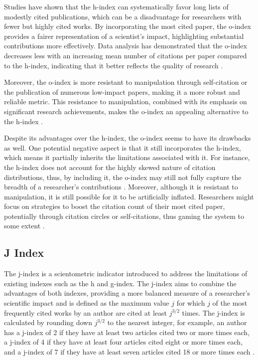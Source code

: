 Studies have shown that the h-index can systematically favor long lists of
modestly cited publications, which can be a disadvantage for researchers with
fewer but highly cited works. By incorporating the most cited paper, the
o-index provides a fairer representation of a scientist's impact, highlighting
substantial contributions more effectively. Data analysis has demonstrated that
the o-index decreases less with an increasing mean number of citations per
paper compared to the h-index, indicating that it better reflects the quality
of research \cite{dorogovtsev2015ranking}.

Moreover, the o-index is more resistant to manipulation through self-citation
or the publication of numerous low-impact papers, making it a more robust and
reliable metric. This resistance to manipulation, combined with its emphasis on
significant research achievements, makes the o-index an appealing alternative
to the h-index \cite{dorogovtsev2015ranking}.

Despite its advantages over the h-index, the o-index seems to have its
drawbacks as well. One potential negative aspect is that it still incorporates
the h-index, which means it partially inherits the limitations associated with
it. For instance, the h-index does not account for the highly skewed nature of
citation distributions, thus, by including it, the o-index may still not fully
capture the breadth of a researcher's contributions
\cite{dorogovtsev2015ranking}. Moreover, although it is resistant to
manipulation, it is still possible for it to be artificially inflated.
Researchers might focus on strategies to boost the citation count of their most
cited paper, potentially through citation circles or self-citations, thus
gaming the system to some extent \cite{dorogovtsev2015ranking}.

\subsection{J Index}
The j-index is a scientometric indicator introduced to address the limitations
of existing indexes such as the h and g-index. The j-index aims to combine the
advantages of both indexes, providing a more balanced measure of a researcher's
scientific impact and is defined as the maximum value $j$ for which $j$ of the
most frequently cited works by an author are cited at least $j^{3/2}$ times.
The j-index is calculated by rounding down $j^{3/2}$ to the nearest integer,
for example, an author has a j-index of 2 if they have at least two articles
cited two or more times each, a j-index of 4 if they have at least four
articles cited eight or more times each, and a j-index of 7 if they have at
least seven articles cited 18 or more times each \cite{mikhailov2014new}.

